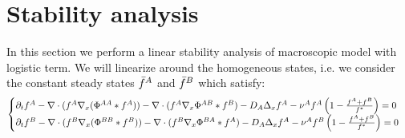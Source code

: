 \section{Stability analysis}

In this section we perform a linear stability analysis of macroscopic model with logistic term.
We will linearize around the homogeneous states, i.e. we consider the constant steady states ${\bar{f}^A}$ and ${\bar{f}^B}$ which satisfy:
	\begin{equation}
\begin{cases}
{\partial}_t f^{A}-  \nabla \cdot (f^A\nabla_x(\Phi^{AA}* f^A)) - \nabla \cdot (f^A \nabla_x \Phi^{AB}*f^B) - D_A \Delta_x f^A - \nu^{A}f^A\left( 1-\frac{f^A+f^B}{f^{*}} \right)=0 \\

{\partial}_t f^{B}-  \nabla \cdot (f^B\nabla_x(\Phi^{BB}* f^B)) - \nabla \cdot (f^B \nabla_x \Phi^{BA}*f^A) - D_A \Delta_x f^A - \nu^{A}f^B\left( 1-\frac{f^A+f^B}{f^{*}} \right)=0
\end{cases}
\end{equation}

